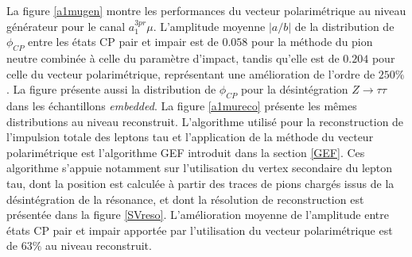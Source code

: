 La figure \ref{a1mugen} montre les performances du vecteur polarimétrique au niveau générateur pour le canal $a_1^{3pr}\mu$. L'amplitude moyenne $|a/b|$ de la distribution de $\phi_{CP}$ entre les états CP pair et impair est de $0.058$ pour la méthode du pion neutre combinée à celle du paramètre d'impact, tandis qu'elle est de $0.204$ pour celle du vecteur polarimétrique, représentant une amélioration de l'ordre de $250\%$. La figure présente aussi la distribution de $\phi_{CP}$ pour la désintégration $Z\to\tau\tau$ dans les échantillons \textit{embedded}. La figure \ref{a1mureco} présente les mêmes distributions au niveau reconstruit. L'algorithme utilisé pour la reconstruction de l'impulsion totale des leptons tau et l'application de la méthode du vecteur polarimétrique est l'algorithme GEF introduit dans la section \ref{GEF}. Ces algorithme s'appuie notamment sur l'utilisation du vertex secondaire du lepton tau, dont la position est calculée à partir des traces de pions chargés issus de la désintégration de la résonance, et dont la résolution de reconstruction est présentée dans la figure \ref{SVreso}. L'amélioration moyenne de l'amplitude entre états CP pair et impair apportée par l'utilisation du vecteur polarimétrique est de $63\%$ au niveau reconstruit. \\

